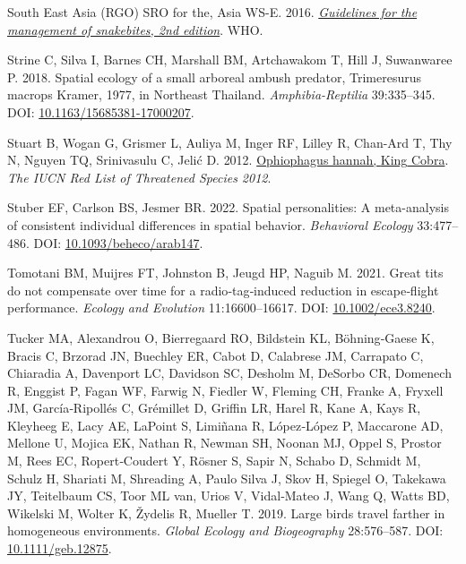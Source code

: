 \documentclass[10pt,a4paper]{article}
\newlength{\cslhangindent}
\newenvironment{CSLReferences}[2] %
 {\begin{list}{}{%
  \setlength{\itemindent}{0pt}
  \setlength{\leftmargin}{0pt}
  \setlength{\parsep}{0pt}
  \ifodd #1
   \setlength{\leftmargin}{\cslhangindent}
   \setlength{\itemindent}{-1\cslhangindent}
  \fi
  \setlength{\itemsep}{#2\baselineskip}}}
 {\end{list}}
\begin{document}
\begin{CSLReferences}{1}{0}
South East Asia (RGO) SRO for the, Asia WS-E. 2016. \emph{\href{https://www.who.int/publications/i/item/9789290225300}{Guidelines for the management of snakebites, 2nd edition}}. WHO.

Strine C, Silva I, Barnes CH, Marshall BM, Artchawakom T, Hill J, Suwanwaree P. 2018. Spatial ecology of a small arboreal ambush predator, {Trimeresurus} macrops {Kramer}, 1977, in {Northeast} {Thailand}. \emph{Amphibia-Reptilia} 39:335--345. DOI: \href{https://doi.org/10.1163/15685381-17000207}{10.1163/15685381-17000207}.

Stuart B, Wogan G, Grismer L, Auliya M, Inger RF, Lilley R, Chan-Ard T, Thy N, Nguyen TQ, Srinivasulu C, Jelić D. 2012. \href{http://dx.doi.org/10.2305/IUCN.UK.2012-\%201.RLTS.T177540A1491874.en\%0ACopyright:}{Ophiophagus hannah, {King} {Cobra}}. \emph{The IUCN Red List of Threatened Species 2012}.

Stuber EF, Carlson BS, Jesmer BR. 2022. Spatial personalities: A meta-analysis of consistent individual differences in spatial behavior. \emph{Behavioral Ecology} 33:477--486. DOI: \href{https://doi.org/10.1093/beheco/arab147}{10.1093/beheco/arab147}.

Tomotani BM, Muijres FT, Johnston B, Jeugd HP, Naguib M. 2021. Great tits do not compensate over time for a radio‐tag‐induced reduction in escape‐flight performance. \emph{Ecology and Evolution} 11:16600--16617. DOI: \href{https://doi.org/10.1002/ece3.8240}{10.1002/ece3.8240}.

Tucker MA, Alexandrou O, Bierregaard RO, Bildstein KL, Böhning‐Gaese K, Bracis C, Brzorad JN, Buechley ER, Cabot D, Calabrese JM, Carrapato C, Chiaradia A, Davenport LC, Davidson SC, Desholm M, DeSorbo CR, Domenech R, Enggist P, Fagan WF, Farwig N, Fiedler W, Fleming CH, Franke A, Fryxell JM, García‐Ripollés C, Grémillet D, Griffin LR, Harel R, Kane A, Kays R, Kleyheeg E, Lacy AE, LaPoint S, Limiñana R, López‐López P, Maccarone AD, Mellone U, Mojica EK, Nathan R, Newman SH, Noonan MJ, Oppel S, Prostor M, Rees EC, Ropert‐Coudert Y, Rösner S, Sapir N, Schabo D, Schmidt M, Schulz H, Shariati M, Shreading A, Paulo Silva J, Skov H, Spiegel O, Takekawa JY, Teitelbaum CS, Toor ML van, Urios V, Vidal‐Mateo J, Wang Q, Watts BD, Wikelski M, Wolter K, Žydelis R, Mueller T. 2019. Large birds travel farther in homogeneous environments. \emph{Global Ecology and Biogeography} 28:576--587. DOI: \href{https://doi.org/10.1111/geb.12875}{10.1111/geb.12875}.


\end{CSLReferences}
\end{document}
